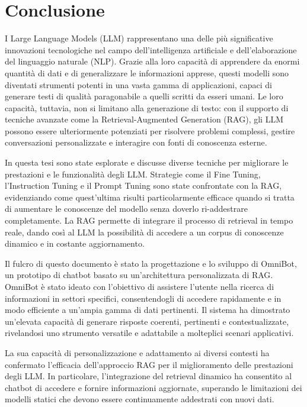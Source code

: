\chapter*{Conclusione}
I Large Language Models (LLM) rappresentano una delle più significative innovazioni tecnologiche nel campo dell'intelligenza artificiale e dell'elaborazione del linguaggio naturale (NLP). Grazie alla loro capacità di apprendere da enormi quantità di dati e di generalizzare le informazioni apprese, questi modelli sono diventati strumenti potenti in una vasta gamma di applicazioni, capaci di generare testi di qualità paragonabile a quelli scritti da esseri umani. Le loro capacità, tuttavia, non si limitano alla generazione di testo: con il supporto di tecniche avanzate come la Retrieval-Augmented Generation (RAG), gli LLM possono essere ulteriormente potenziati per risolvere problemi complessi, gestire conversazioni personalizzate e interagire con fonti di conoscenza esterne.

In questa tesi sono state esplorate e discusse diverse tecniche per migliorare le prestazioni e le funzionalità degli LLM. Strategie come il Fine Tuning, l'Instruction Tuning e il Prompt Tuning sono state confrontate con la RAG, evidenziando come quest'ultima risulti particolarmente efficace quando si tratta di aumentare le conoscenze del modello senza doverlo ri-addestrare completamente. La RAG permette di integrare il processo di retrieval in tempo reale, dando così al LLM la possibilità di accedere a un corpus di conoscenze dinamico e in costante aggiornamento.

Il fulcro di questo documento è stato la progettazione e lo sviluppo di OmniBot, un prototipo di chatbot basato su un'architettura personalizzata di RAG. OmniBot è stato ideato con l'obiettivo di assistere l'utente nella ricerca di informazioni in settori specifici, consentendogli di accedere rapidamente e in modo efficiente a un'ampia gamma di dati pertinenti. Il sistema ha dimostrato un'elevata capacità di generare risposte coerenti, pertinenti e contestualizzate, rivelandosi uno strumento versatile e adattabile a molteplici scenari applicativi.

La sua capacità di personalizzazione e adattamento ai diversi contesti ha confermato l'efficacia dell'approccio RAG per il miglioramento delle prestazioni degli LLM. In particolare, l'integrazione del retrieval dinamico ha consentito al chatbot di accedere e fornire informazioni aggiornate, superando le limitazioni dei modelli statici che devono essere continuamente addestrati con nuovi dati.

